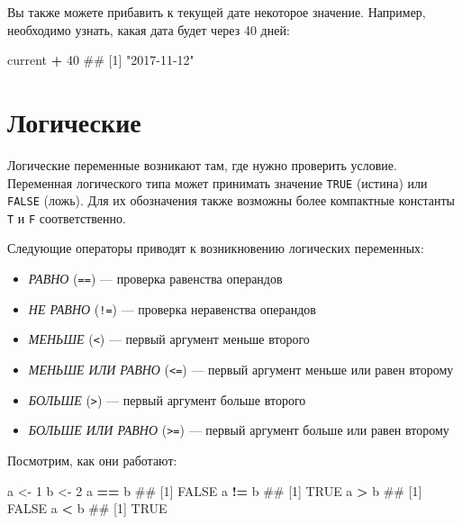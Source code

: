 \documentclass[]{book}
\newenvironment{Shaded}{\begin{snugshade}}{\end{snugshade}}
\newcommand{\DecValTok}[1]{\textcolor[rgb]{0.00,0.00,0.81}{#1}}
\newcommand{\StringTok}[1]{\textcolor[rgb]{0.31,0.60,0.02}{#1}}
\newcommand{\OperatorTok}[1]{\textcolor[rgb]{0.81,0.36,0.00}{\textbf{#1}}}
\newcommand{\NormalTok}[1]{#1}
\providecommand{\tightlist}{%
  \setlength{\itemsep}{0pt}\setlength{\parskip}{0pt}}
\begin{document}
Вы также можете прибавить к текущей дате некоторое значение. Например,
необходимо узнать, какая дата будет через 40 дней:

\begin{Shaded}
\begin{Highlighting}[]
\NormalTok{current }\OperatorTok{+}\StringTok{ }\DecValTok{40}
\NormalTok{## [1] "2017-11-12"}
\end{Highlighting}
\end{Shaded}

\section{Логические}\label{booleans}

Логические переменные возникают там, где нужно проверить условие.
Переменная логического типа может принимать значение \texttt{TRUE}
(истина) или \texttt{FALSE} (ложь). Для их обозначения также возможны
более компактные константы \texttt{T} и \texttt{F} соответственно.

Следующие операторы приводят к возникновению логических переменных:

\begin{itemize}
\tightlist
\item
  \emph{РАВНО} (\texttt{==}) --- проверка равенства операндов
\item
  \emph{НЕ РАВНО} (\texttt{!=}) --- проверка неравенства операндов
\item
  \emph{МЕНЬШЕ} (\texttt{\textless{}}) --- первый аргумент меньше
  второго
\item
  \emph{МЕНЬШЕ ИЛИ РАВНО} (\texttt{\textless{}=}) --- первый аргумент
  меньше или равен второму
\item
  \emph{БОЛЬШЕ} (\texttt{\textgreater{}}) --- первый аргумент больше
  второго
\item
  \emph{БОЛЬШЕ ИЛИ РАВНО} (\texttt{\textgreater{}=}) --- первый аргумент
  больше или равен второму
\end{itemize}

Посмотрим, как они работают:

\begin{Shaded}
\begin{Highlighting}[]
\NormalTok{a <-}\StringTok{ }\DecValTok{1}
\NormalTok{b <-}\StringTok{ }\DecValTok{2}
\NormalTok{a }\OperatorTok{==}\StringTok{ }\NormalTok{b}
\NormalTok{## [1] FALSE}
\NormalTok{a }\OperatorTok{!=}\StringTok{ }\NormalTok{b}
\NormalTok{## [1] TRUE}
\NormalTok{a }\OperatorTok{>}\StringTok{ }\NormalTok{b}
\NormalTok{## [1] FALSE}
\NormalTok{a }\OperatorTok{<}\StringTok{ }\NormalTok{b}
\NormalTok{## [1] TRUE}
\end{Highlighting}
\end{Shaded}
\end{document}
